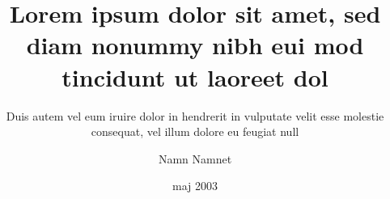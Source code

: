 \title{Lorem ipsum dolor sit amet, sed diam nonummy nibh eui
       mod tincidunt ut laoreet dol}
\subtitle{Duis autem vel eum iruire dolor in hendrerit in
          vulputate velit esse molestie consequat, vel illum
          dolore eu feugiat null}
\author{Namn Namnet}
\date{maj 2003}
\address{KTH School of Computer Science and Communication\\
  SE-100 44 Stockholm\\
  SWEDEN}
\endinput
